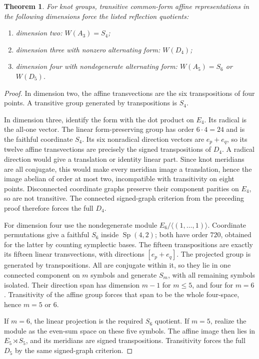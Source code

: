 \documentclass[11pt]{article}
\newtheorem{theorem}{Theorem}
\begin{document}
\begin{theorem}\label{thm:small}
For knot groups, transitive common-form affine representations in the
following dimensions force the listed reflection quotients:
\begin{enumerate}
\item dimension two: $W(A_3)=S_4$;
\item dimension three with nonzero alternating form: $W(D_4)$;
\item dimension four with nondegenerate alternating form:
$W(A_5)=S_6$ or $W(D_5)$.
\end{enumerate}
\end{theorem}
\begin{proof}
In dimension two, the affine transvections are the six transpositions
of four points. A transitive group generated by transpositions is $S_4$.

In dimension three, identify the form with the dot product on $E_4$.
Its radical is the all-one vector. The linear form-preserving group
has order $6\cdot4=24$ and is the faithful coordinate $S_4$.
Its six nonradical direction vectors are $e_p+e_q$, so its twelve
affine transvections are precisely the signed transpositions of $D_4$.
A radical direction would give a translation or identity linear part.
Since knot meridians are all conjugate, this would make every meridian
image a translation, hence the image abelian of order at most two,
incompatible with transitivity on eight points.
Disconnected coordinate graphs preserve their component parities on
$E_4$, so are not transitive. The connected signed-graph criterion
from the preceding proof therefore forces the full $D_4$.

For dimension four use the nondegenerate module
$E_6/\langle(1,\ldots,1)\rangle$. Coordinate permutations give a faithful
$S_6$ inside $\operatorname{Sp}(4,2)$; both have order $720$, obtained
for the latter by counting symplectic bases. The fifteen transpositions
are exactly its fifteen linear transvections, with directions
$[e_p+e_q]$. The projected group is generated by transpositions.
All are conjugate within it, so they lie in one connected component on
$m$ symbols and generate $S_m$, with all remaining symbols isolated.
Their direction span has dimension $m-1$ for $m\le5$, and four for
$m=6$. Transitivity of the affine group forces that span to be the
whole four-space, hence $m=5$ or $6$.

If $m=6$, the linear projection is the required $S_6$ quotient. If
$m=5$, realize the module as the even-sum space on these five symbols.
The affine image then lies in $E_5\rtimes S_5$, and its meridians are
signed transpositions. Transitivity forces the full $D_5$ by the same
signed-graph criterion.
\end{proof}
\end{document}
